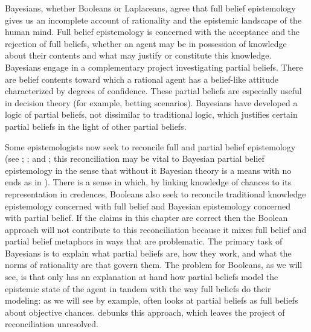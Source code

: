 \documentclass[phd,12pt,oneside]{ubcthesis}
\begin{document}
Bayesians, whether Booleans or Laplaceans, agree that full belief
epistemology gives us an incomplete account of rationality and the
epistemic landscape of the human mind. Full belief epistemology is
concerned with the acceptance and the rejection of full beliefs,
whether an agent may be in possession of knowledge about their
contents and what may justify or constitute this knowledge. Bayesians
engage in a complementary project investigating partial beliefs. There
are belief contents toward which a rational agent has a belief-like
attitude characterized by degrees of confidence. These partial beliefs
are especially useful in decision theory (for example, betting
scenarios). Bayesians have developed a logic of partial beliefs, not
dissimilar to traditional logic, which justifies certain partial
beliefs in the light of other partial beliefs.

Some epistemologists now seek to reconcile full and partial belief
epistemology (see ; ; and
; this reconciliation may be vital to Bayesian
partial belief epistemology in the sense that without it Bayesian
theory is a means with no ends as in ).
There is a sense in which, by linking knowledge of chances to its
representation in credences, Booleans also seek to reconcile
traditional knowledge epistemology concerned with full belief and
Bayesian epistemology concerned with partial belief. If the claims in
this chapter are correct then the Boolean approach will not contribute
to this reconciliation because it mixes full belief and partial belief
metaphors in ways that are problematic. The
primary task of Bayesians is to explain what partial beliefs are, how
they work, and what the norms of rationality are that govern them. The
problem for Booleans, as we will see, is that only {\anderson} has an
explanation at hand how partial beliefs model the epistemic state of
the agent
in tandem with the way full beliefs do their modeling: as we will see
by example, {\anderson} often looks at partial beliefs as full beliefs
about objective chances. {\augustin} debunks this approach, which
leaves the project of reconciliation unresolved.
\end{document}
